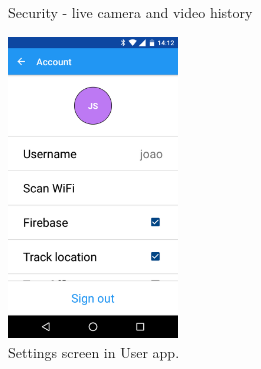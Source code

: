 \begin{figure}
\centering     %
{}
\caption{Security - live camera and video history}
\label{imp_user_camera}
\end{figure}

\begin{figure}[]
\centering
\includegraphics[width=0.4\textwidth]{Figures/user_settings}
\caption{Settings screen in User app.}
\label{user_settings}
\end{figure}




